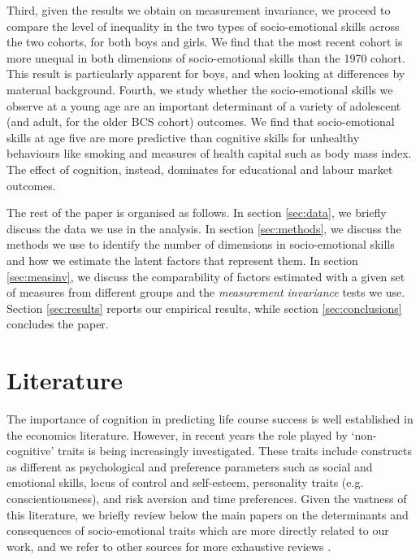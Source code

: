 Third, given the results we obtain on measurement invariance, we proceed to compare the level of inequality in the two types of socio-emotional skills across the two cohorts, for both boys and girls. We find that the most recent cohort is more unequal in both dimensions of socio-emotional skills than the 1970 cohort. This result is particularly apparent for boys, and when looking at differences by maternal background. Fourth, we study whether the socio-emotional skills we observe at a young age are an important determinant of a variety of adolescent (and adult, for the older BCS cohort) outcomes. We find that socio-emotional skills at age five are more predictive than cognitive skills for unhealthy behaviours like smoking and measures of health capital such as body mass index. The effect of cognition, instead, dominates for educational and labour market outcomes.

The rest of the paper is organised as follows. In section \ref{sec:data}, we briefly discuss the data we use in the analysis. In section \ref{sec:methods}, we discuss the methods we use to identify the number of dimensions in socio-emotional skills and how we estimate the latent factors that represent them. In section \ref{sec:measinv}, we discuss the comparability of factors estimated with a given set of measures from different groups and the \emph{measurement invariance} tests we use. Section \ref{sec:results} reports our empirical results, while section \ref{sec:conclusions} concludes the paper.

\section{Literature \label{sec:lit}}

The importance of cognition in predicting life course success is well established in the economics literature. However, in recent years the role played by `non-cognitive' traits is being increasingly investigated. These traits include constructs as different as psychological and preference parameters such as social and emotional skills, locus of control and self-esteem, personality traits (e.g. conscientiousness), and risk aversion and time preferences. Given the vastness of this literature, we briefly review below the main papers on the determinants and consequences of socio-emotional traits which are more directly related to our work, and we refer to other sources for more exhaustive reviews \citep{Borghans2008,Almlund2011,Goodman2015,Kautz2014}.

